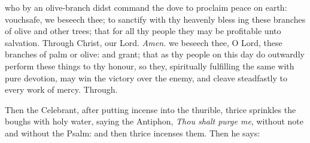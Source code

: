 {} who by an olive-branch didst command the dove to proclaim peace on earth: vouchsafe, we beseech thee; to sanctify with thy heavenly bless {} ing these branches of olive and other trees; that for all thy people they may be profitable unto salvation. Through Christ, our Lord. \textit{Amen.}
{} we beseech thee, O Lord, these branches of palm or olive: and grant; that as thy people on this day do outwardly perform these things to thy honour, so they, spiritually fulfilling the same with pure devotion, may win the victory over the enemy, and cleave steadfastly to every work of mercy. Through.
\begin{rubric}
    Then the Celebrant, after putting incense into the thurible, thrice sprinkles the boughs with holy water, saying the Antiphon, \emph{Thou shalt purge me}, without note and without the Psalm: and then thrice incenses them. Then he says:
\end{rubric}

